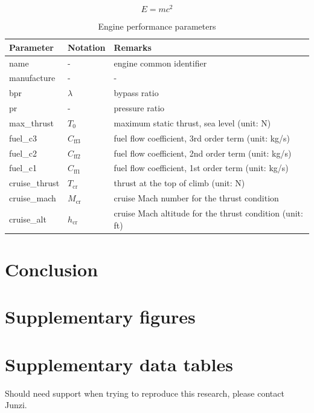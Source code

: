 \documentclass[
  manuscript=data,  %
  year=20xx,
  volume=x,
]{joas}
\begin{document}
\blindtext

\begin{equation}
  E = m c^2
\end{equation}

\blindtext

\begin{table}[H]
  \centering
  \small
  \caption{Engine performance parameters}
  \label{tb:eng_perf_params}
  \begin{tabular}{lll}
  \toprule
  \textbf{Parameter} & \textbf{Notation} & \textbf{Remarks} \\
  \midrule
  name & - & engine common identifier \\
  manufacture & - & -  \\
  bpr & $\lambda$ & bypass ratio \\
  pr & - & pressure ratio \\
  max\_thrust & $T_0$ & maximum static thrust, sea level (unit: N) \\
  fuel\_c3 & $C_\mathrm{ff3}$ & fuel flow coefficient, 3rd order term (unit: kg/s) \\
  fuel\_c2 & $C_\mathrm{ff2}$ & fuel flow coefficient, 2nd order term (unit: kg/s) \\
  fuel\_c1 & $C_\mathrm{ff1}$ & fuel flow coefficient, 1st order term (unit: kg/s) \\
  cruise\_thrust & $T_\mathrm{cr}$ & thrust at the top of climb (unit: N) \\
  cruise\_mach & $M_\mathrm{cr}$ & cruise Mach number for the thrust condition \\
  cruise\_alt & $h_\mathrm{cr}$ & cruise Mach altitude for the thrust condition (unit: ft) \\
  \bottomrule
  \end{tabular}
\end{table}

\blindtext

\section{Conclusion}

\Blindtext


\begin{acknowledgement}
\blindtext
\end{acknowledgement}


\printbibliography

\appendix

\section{Supplementary figures}
\blindtext

\section{Supplementary data tables}
\blindtext

\begin{suppinfo}
Should need support when trying to reproduce this research, please contact Junzi.
\end{suppinfo}
\end{document}
